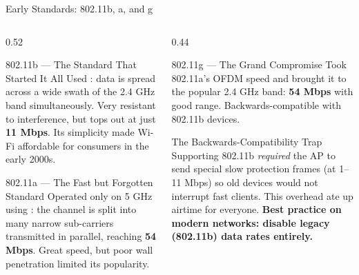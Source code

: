 \documentclass[aspectratio=169]{beamer}
\begin{document}
\begin{frame}{Early Standards: 802.11b, a, and g}
    \begin{columns}[T]
        \begin{column}{0.52\textwidth}
            \begin{block}{802.11b --- The Standard That Started It All}
                \footnotesize
                Used : data is spread across a wide swath of the 2.4 GHz band simultaneously. Very resistant to interference, but tops out at just \textbf{11 Mbps}. Its simplicity made Wi-Fi affordable for consumers in the early 2000s.
            \end{block}
            \vspace{0.3em}
            \begin{block}{802.11a --- The Fast but Forgotten Standard}
                \footnotesize
                Operated only on 5 GHz using : the channel is split into many narrow sub-carriers transmitted in parallel, reaching \textbf{54 Mbps}. Great speed, but poor wall penetration limited its popularity.
            \end{block}
        \end{column}
        \begin{column}{0.44\textwidth}
            \begin{block}{802.11g --- The Grand Compromise}
                \footnotesize
                Took 802.11a's OFDM speed and brought it to the popular 2.4 GHz band: \textbf{54 Mbps} with good range. Backwards-compatible with 802.11b devices.
            \end{block}
            \vspace{0.3em}
            \begin{alertblock}{The Backwards-Compatibility Trap}
                \footnotesize
                Supporting 802.11b \emph{required} the AP to send special slow protection frames (at 1--11 Mbps) so old devices would not interrupt fast clients. This overhead ate up airtime for everyone. \textbf{Best practice on modern networks: disable legacy (802.11b) data rates entirely.}
            \end{alertblock}
        \end{column}
    \end{columns}
\end{frame}
\end{document}
